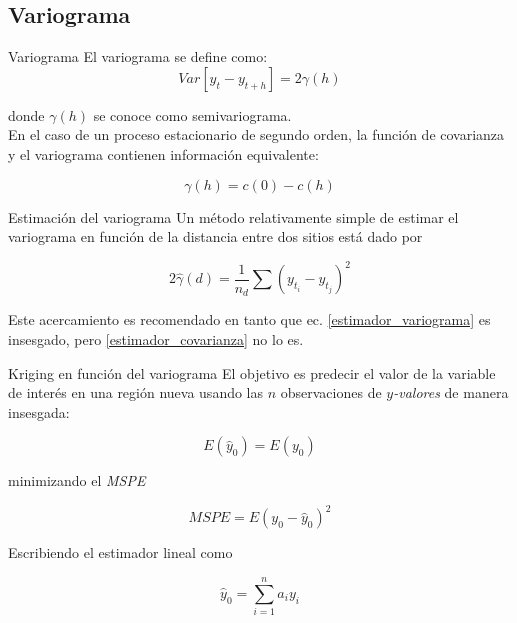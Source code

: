\documentclass[12pts]{beamer}
\begin{document}
	\subsection{Variograma}
	\begin{frame}{Variograma}
		El variograma se define como:
		\begin{equation}
		Var\left[y_t - y_{t+h}\right] = 2\gamma(h)\label{variograma}
		\end{equation}
		
		\noindent donde $\gamma(h)$ se conoce como semivariograma.\\[5mm]
		
		En el caso de un proceso estacionario de segundo orden, la función de covarianza y el variograma contienen información equivalente:
		
		\begin{equation}
		\gamma (h) = c(0) - c(h) \label{semivariograma_segundo_orden}
		\end{equation}
	\end{frame}

	\begin{frame}{Estimación del variograma}
		Un método relativamente simple de estimar el variograma en función de la distancia entre dos sitios está dado por
		
		\begin{equation}
		2\hat{\gamma}(d) = \frac{1}{n_d}\sum (y_{t_i} - y_{t_j})^2 \label{estimador_variograma}
		\end{equation}
		
		Este acercamiento es recomendado en tanto que ec. \ref{estimador_variograma} es insesgado, pero \ref{estimador_covarianza} no lo es. 
	\end{frame}

	\begin{frame}{Kriging en función del variograma}
		El objetivo es predecir el valor de la variable de interés en una región nueva usando las $n$ observaciones de \textit{$y$-valores} de manera insesgada:
		
		\begin{equation}
		E\left(\hat{y}_0\right) = E\left(y_0\right) \label{insesgadeza_variograma}
		\end{equation}
		
		\noindent minimizando el \textit{MSPE}
		
		\begin{equation}
		MSPE = E\left(y_0 - \hat{y}_0\right)^2\label{MSPE_variograma}
		\end{equation}
		
		\noindent Escribiendo el estimador lineal como
		
		\begin{equation}
		\hat{y}_0 = \sum_{i=1}^{n} a_i y_i\label{estimador_predictivo_variograma}
		\end{equation}
	\end{frame}
\end{document}
